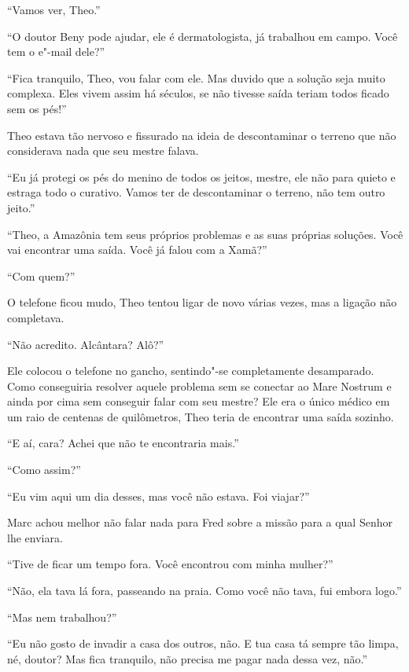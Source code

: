 ``Vamos ver, Theo.''

``O doutor Beny pode ajudar, ele é dermatologista, já trabalhou em
campo. Você tem o e"-mail dele?''

``Fica tranquilo, Theo, vou falar com ele. Mas duvido que a solução seja
muito complexa. Eles vivem assim há séculos, se não tivesse saída teriam
todos ficado sem os pés!''

Theo estava tão nervoso e fissurado na ideia de descontaminar o terreno
que não considerava nada que seu mestre falava.

``Eu já protegi os pés do menino de todos os jeitos, mestre, ele não
para quieto e estraga todo o curativo. Vamos ter de descontaminar o
terreno, não tem outro jeito.''

``Theo, a Amazônia tem seus próprios problemas e as suas próprias
soluções. Você vai encontrar uma saída. Você já falou com a Xamã?''

``Com quem?''

O telefone ficou mudo, Theo tentou ligar de novo várias vezes, mas a
ligação não completava.

``Não acredito. Alcântara? Alô?''

Ele colocou o telefone no gancho, sentindo"-se completamente desamparado.
Como conseguiria resolver aquele problema sem se conectar ao Mare
Nostrum e ainda por cima sem conseguir falar com seu mestre? Ele era o
único médico em um raio de centenas de quilômetros, Theo teria de
encontrar uma saída sozinho.

\asterisc


``E aí, cara? Achei que não te encontraria mais.''

``Como assim?''

``Eu vim aqui um dia desses, mas você não estava. Foi viajar?''

Marc achou melhor não falar nada para Fred sobre a missão para a qual
Senhor  lhe enviara.

``Tive de ficar um tempo fora. Você encontrou com minha mulher?''

``Não, ela tava lá fora, passeando na praia. Como você não tava, fui
embora logo.''

``Mas nem trabalhou?''

``Eu não gosto de invadir a casa dos outros, não. E tua casa tá sempre
tão limpa, né, doutor? Mas fica tranquilo, não precisa me pagar nada
dessa vez, não.''

